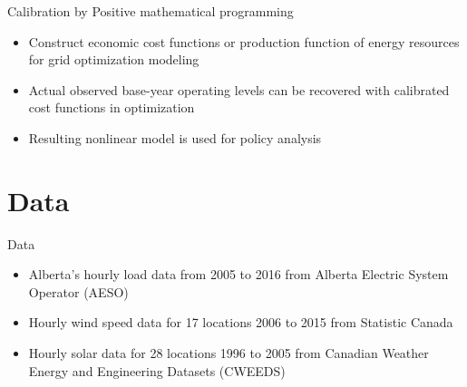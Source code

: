 \documentclass[newPxFont,numfooter,progressbar,sectionpages]{beamer}
\begin{document}

\begin{frame}[c]{Calibration by Positive mathematical programming}

\begin{itemize}
\item Construct economic cost functions or production function of energy resources for grid optimization modeling   
\item Actual observed base-year operating levels can be recovered with calibrated cost functions in optimization
\item Resulting nonlinear model is used for policy analysis

\end{itemize}


\end{frame}




%
%
\section{Data}




\begin{frame}[c]{Data}

\begin{itemize}
\item Alberta’s hourly load data from 2005 to 2016 from Alberta Electric System Operator (AESO)
\item Hourly wind speed data for 17 locations  2006 to 2015 from Statistic Canada
\item Hourly solar data for 28 locations  1996 to 2005 from Canadian Weather Energy and Engineering Datasets (CWEEDS)

\end{itemize}


\end{frame}





\end{document}
